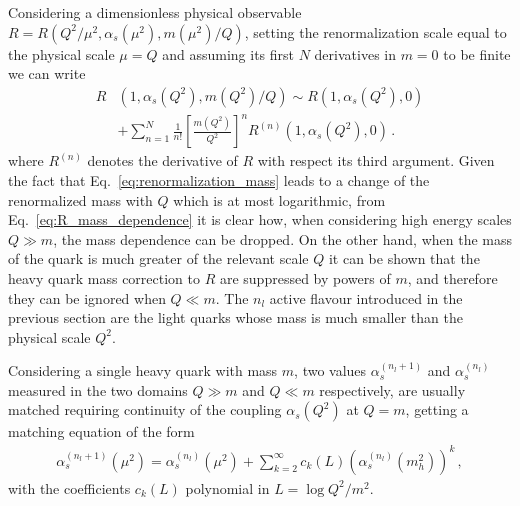 %
Considering a dimensionless physical observable $R = R\left(Q^2/\mu^2, \alpha_s\left(\mu^2\right),m\left(\mu^2\right)/Q \right)$,
setting the renormalization scale equal to the physical scale $\mu=Q$ and assuming its first $N$ derivatives in $m=0$ to be finite
we can write
\begin{align}
    \label{eq:R_mass_dependence}
    R&\left(1, \alpha_s\left(Q^2\right),m\left(Q^2\right)/Q \right) \sim
    R\left(1, \alpha_s\left(Q^2\right),0 \right)\nonumber \\
    & + \sum_{n=1}^{N}\frac{1}{n!}\left[\frac{m\left(Q^2\right)}{Q^2}\right]^n R^{(n)}\left(1,\alpha_s\left(Q^2\right),0\right)\,.
\end{align}
where $R^{(n)}$ denotes the derivative of $R$ with respect its third argument. 
Given the fact that Eq.~\ref{eq:renormalization_mass} leads to a change of the renormalized mass with $Q$ 
which is at most logarithmic, from Eq.~\ref{eq:R_mass_dependence} it is clear how, when considering 
high energy scales $Q \gg m$, the mass dependence can be dropped.
%
On the other hand, when the mass of the quark is much greater of the relevant scale $Q$ it can be shown 
that the heavy quark mass correction to $R$ are suppressed by powers of $m$, and therefore they can be ignored when
$Q \ll m$. The $n_l$ active flavour introduced in the previous section are the light quarks whose mass is much smaller than
the physical scale $Q^2$.

%
Considering a single heavy quark with mass $m$, two values $\alpha_s^{(n_l+1)}$ and $\alpha_s^{(n_l)}$ 
measured in the two domains $Q \gg m$ and $Q \ll m$ respectively,
are usually matched requiring 
continuity of the coupling $\alpha_s\left(Q^2\right)$ at $Q=m$, getting a matching equation of the form
\begin{align}
    \alpha_s^{(n_l+1)}\left(\mu^2\right) = 
    \alpha_s^{(n_l)}\left(\mu^2\right) 
    + \sum_{k=2}^{\infty} c_k\left(L\right) \left(\alpha_s^{(n_l)}\left(m_h^2\right)\right)^k\,,
\end{align}
with the coefficients $c_k\left(L\right)$  polynomial in $L=\log Q^2/m^2$.




